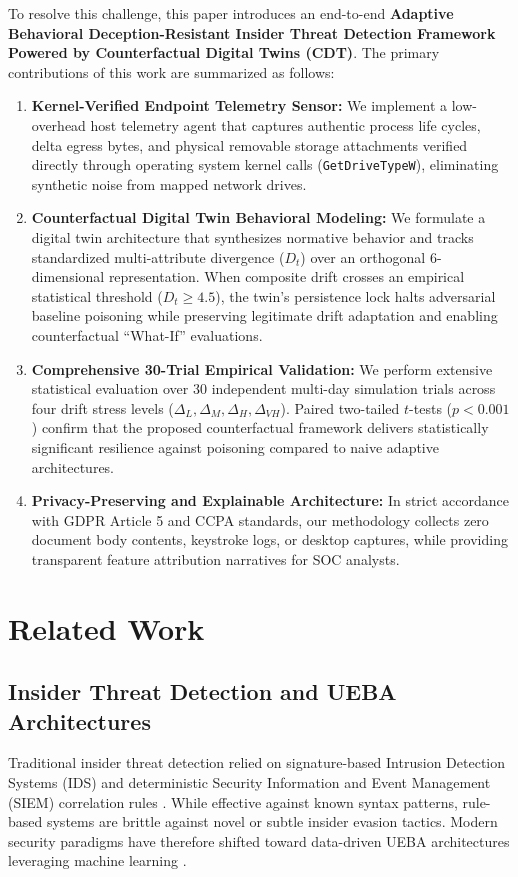 \documentclass[conference]{IEEEtran}
\begin{document}
To resolve this challenge, this paper introduces an end-to-end \textbf{Adaptive Behavioral Deception-Resistant Insider Threat Detection Framework Powered by Counterfactual Digital Twins (CDT)}. The primary contributions of this work are summarized as follows:
\begin{enumerate}
    \item \textbf{Kernel-Verified Endpoint Telemetry Sensor:} We implement a low-overhead host telemetry agent that captures authentic process life cycles, delta egress bytes, and physical removable storage attachments verified directly through operating system kernel calls (\texttt{GetDriveTypeW}), eliminating synthetic noise from mapped network drives.
    \item \textbf{Counterfactual Digital Twin Behavioral Modeling:} We formulate a digital twin architecture that synthesizes normative behavior and tracks standardized multi-attribute divergence ($D_t$) over an orthogonal 6-dimensional representation. When composite drift crosses an empirical statistical threshold ($D_t \ge 4.5$), the twin's persistence lock halts adversarial baseline poisoning while preserving legitimate drift adaptation and enabling counterfactual ``What-If'' evaluations.
    \item \textbf{Comprehensive 30-Trial Empirical Validation:} We perform extensive statistical evaluation over 30 independent multi-day simulation trials across four drift stress levels ($\Delta_L, \Delta_M, \Delta_H, \Delta_{VH}$). Paired two-tailed $t$-tests ($p < 0.001$) confirm that the proposed counterfactual framework delivers statistically significant resilience against poisoning compared to naive adaptive architectures.
    \item \textbf{Privacy-Preserving and Explainable Architecture:} In strict accordance with GDPR Article 5 and CCPA standards, our methodology collects zero document body contents, keystroke logs, or desktop captures, while providing transparent feature attribution narratives for SOC analysts.
\end{enumerate}

\section{Related Work}

\subsection{Insider Threat Detection and UEBA Architectures}
Traditional insider threat detection relied on signature-based Intrusion Detection Systems (IDS) and deterministic Security Information and Event Management (SIEM) correlation rules \cite{b2}. While effective against known syntax patterns, rule-based systems are brittle against novel or subtle insider evasion tactics. Modern security paradigms have therefore shifted toward data-driven UEBA architectures leveraging machine learning \cite{b3}. 
\end{document}
